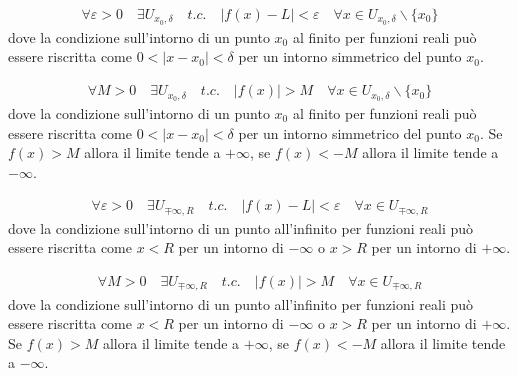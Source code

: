 \documentclass[letterpaper,10pt,italian]{jupyterBook}
\begin{document}
\sphinxAtStartPar
{}
\begin{equation*}
\begin{split}\forall \varepsilon > 0 \quad \exists U_{x_0,\delta} \quad {t.c.} \quad |f(x) - L| < \varepsilon \quad \forall x \in U_{x_0, \delta} \backslash \{x_0\}\end{split}
\end{equation*}
\sphinxAtStartPar
dove la condizione sull’intorno di un punto \(x_0\) al finito per funzioni reali può essere riscritta come \(0 < | x - x_0 | <  \delta\) per un intorno simmetrico del punto \(x_0\).

\sphinxAtStartPar
{}
\begin{equation*}
\begin{split}\forall M > 0 \quad \exists U_{x_0,\delta} \quad {t.c.} \quad |f(x)| > M \quad \forall x \in U_{x_0, \delta} \backslash \{x_0\}\end{split}
\end{equation*}
\sphinxAtStartPar
dove la condizione sull’intorno di un punto \(x_0\) al finito per funzioni reali può essere riscritta come \(0 < | x - x_0 | <  \delta\) per un intorno simmetrico del punto \(x_0\). Se \(f(x) > M\) allora il limite tende a \(+\infty\), se \(f(x) < -M\) allora il limite tende a \(-\infty\).

\sphinxAtStartPar
{}
\begin{equation*}
\begin{split}\forall \varepsilon > 0 \quad \exists U_{\mp\infty,R} \quad {t.c.} \quad |f(x) - L| < \varepsilon \quad \forall x \in U_{\mp\infty, R}\end{split}
\end{equation*}
\sphinxAtStartPar
dove la condizione sull’intorno di un punto all’infinito per funzioni reali può essere riscritta come \(x < R\) per un intorno di \(-\infty\) o \(x > R\) per un intorno di \(+\infty\).

\sphinxAtStartPar
{}
\begin{equation*}
\begin{split}\forall M > 0 \quad \exists U_{\mp \infty, R} \quad {t.c.} \quad |f(x)| > M \quad \forall x \in U_{\mp \infty, R}\end{split}
\end{equation*}
\sphinxAtStartPar
dove la condizione sull’intorno di un punto all’infinito per funzioni reali può essere riscritta come \(x < R\) per un intorno di \(-\infty\) o \(x > R\) per un intorno di \(+\infty\). Se \(f(x) > M\) allora il limite tende a \(+\infty\), se \(f(x) < -M\) allora il limite tende a \(-\infty\).
\end{document}
